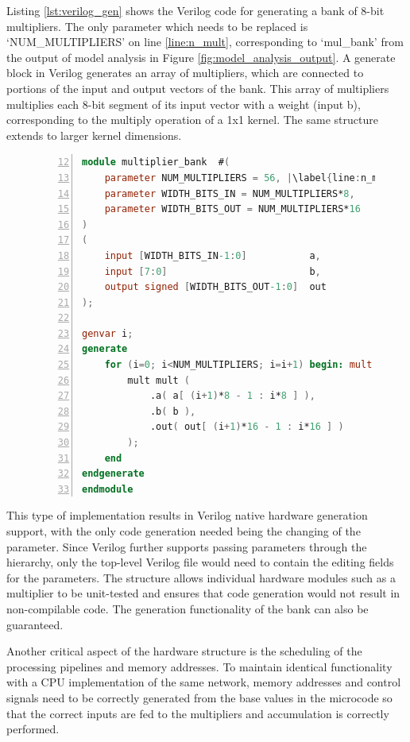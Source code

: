 \documentclass{uw-ece-wkrpt}
\begin{document}
Listing \ref{lst:verilog_gen} shows the Verilog code for generating a bank of 8-bit multipliers. The only parameter which needs to be replaced is `NUM\_MULTIPLIERS' on line \ref{line:n_mult}, corresponding to `mul\_bank' from the output of model analysis in Figure \ref{fig:model_analysis_output}. A generate block in Verilog generates an array of multipliers, which are connected to portions of the input and output vectors of the bank. This array of multipliers multiplies each 8-bit segment of its input vector with a \gls{weight} (input b), corresponding to the multiply operation of a 1x1 \gls{kernel}. The same structure extends to larger \gls{kernel} dimensions.

\begin{figure}
\centering
\begin{lstlisting}[caption={Verilog compile-time generation}, label=lst:verilog_gen, language=Verilog, escapechar=|, numbers=left, firstnumber=12]
module multiplier_bank  #(
    parameter NUM_MULTIPLIERS = 56, |\label{line:n_mult}|
    parameter WIDTH_BITS_IN = NUM_MULTIPLIERS*8,
    parameter WIDTH_BITS_OUT = NUM_MULTIPLIERS*16
)
(
    input [WIDTH_BITS_IN-1:0]           a,
    input [7:0]                         b,
    output signed [WIDTH_BITS_OUT-1:0]  out
);

genvar i;
generate
    for (i=0; i<NUM_MULTIPLIERS; i=i+1) begin: mult
        mult mult (
            .a( a[ (i+1)*8 - 1 : i*8 ] ),
            .b( b ),
            .out( out[ (i+1)*16 - 1 : i*16 ] )
        );
    end
endgenerate
endmodule
\end{lstlisting}
\end{figure}

This type of implementation results in Verilog native hardware generation support, with the only code generation needed being the changing of the parameter. Since Verilog further supports passing parameters through the hierarchy, only the top-level Verilog file would need to contain the editing fields for the parameters. The structure allows individual hardware modules such as a multiplier to be unit-tested and ensures that code generation would not result in non-compilable code. The generation functionality of the bank can also be guaranteed.

Another critical aspect of the hardware structure is the scheduling of the processing pipelines and memory addresses. To maintain identical functionality with a CPU implementation of the same network, memory addresses and control signals need to be correctly generated from the base values in the microcode so that the correct inputs are fed to the multipliers and accumulation is correctly performed.
\end{document}
